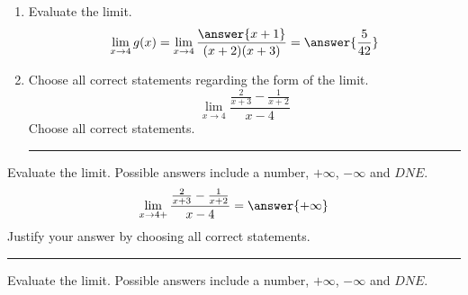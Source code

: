 \documentclass{ximera}
\begin{document}
\begin{exercise}
\begin{exercise}
\begin{enumerate}
\item Evaluate the limit.
\[
\lim_{x\to4}g(x) = \lim_{x\to4}\dfrac{\answer{x+1}}{(x+2)(x+3)}=\answer{\frac{5}{42}}
\]

\item Choose all correct statements regarding  the form of the limit. 
\[
\lim_{x\to4}\dfrac{ \frac{2}{x+3}-\frac{1}{x+2}}{x-4}
\]
Choose all correct statements.
\begin{selectAll} 
\end{selectAll}
\noindent\rule[0.5ex]{\linewidth}{0.2pt}
\end{enumerate}
\begin{exercise}
 Evaluate the limit. Possible answers include a number, $+\infty$, $-\infty$ and $DNE$.
\[
\lim_{x\to4+}\dfrac{ \frac{2}{x+3}-\frac{1}{x+2}}{x-4}=\answer{+\infty}
\]
 Justify your answer  by choosing all correct statements.
 \begin{selectAll} 
\end{selectAll}
\noindent\rule[0.5ex]{\linewidth}{0.2pt}
\begin{exercise}
 Evaluate the limit. Possible answers include a number, $+\infty$, $-\infty$ and $DNE$.


\end{exercise}
\end{exercise}
\end{exercise}
\end{exercise}
\end{document}
